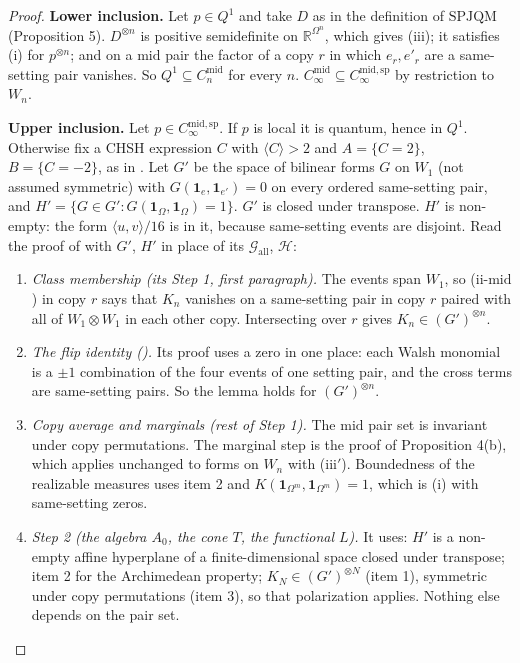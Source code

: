 \documentclass[11pt,a4paper]{article}
\theoremstyle{definition}
\theoremstyle{remark}
\newcommand{\ind}[1]{\mathbf{1}_{#1}}
\newcommand{\SPJQM}{\mathrm{SPJQM}}
\newcommand{\md}{\mathrm{mid}}
\begin{document}
\begin{proof}
\textbf{Lower inclusion.} Let $p \in Q^1$ and take $D$ as in the definition of $\SPJQM$ (Proposition 5). $D^{\otimes n}$ is positive semidefinite on $\mathbb{R}^{\Omega^n}$, which gives (iii); it satisfies (i) for $p^{\otimes n}$; and on a $\md$ pair the factor of a copy $r$ in which $e_r, e'_r$ are a same-setting pair vanishes. So $Q^1 \subseteq C_n^{\md}$ for every $n$. $C_\infty^{\md} \subseteq C_\infty^{\md,\mathrm{sp}}$ by restriction to $W_n$.

\textbf{Upper inclusion.} Let $p \in C_\infty^{\md,\mathrm{sp}}$. If $p$ is local it is quantum, hence in $Q^1$. Otherwise fix a CHSH expression $C$ with $\langle C \rangle > 2$ and $A = \{C = 2\}$, $B = \{C = -2\}$, as in \cite{R7}. Let $G'$ be the space of bilinear forms $G$ on $W_1$ (not assumed symmetric) with $G(\ind{e}, \ind{e'}) = 0$ on every ordered same-setting pair, and $H' = \{G \in G' : G(\ind{\Omega}, \ind{\Omega}) = 1\}$. $G'$ is closed under transpose. $H'$ is non-empty: the form $\langle u, v \rangle/16$ is in it, because same-setting events are disjoint. Read the proof of \cite[Theorem 13]{R7} with $G'$, $H'$ in place of its $\mathcal{G}_{\mathrm{all}}$, $\mathcal{H}$:
\begin{enumerate}
  \item \emph{Class membership (its Step 1, first paragraph).} The events span $W_1$, so (ii-$\md$) in copy $r$ says that $K_n$ vanishes on a same-setting pair in copy $r$ paired with all of $W_1 \otimes W_1$ in each other copy. Intersecting over $r$ gives $K_n \in (G')^{\otimes n}$.
  \item \emph{The flip identity (\cite[Lemma 12]{R7}).} Its proof uses a zero in one place: each Walsh monomial is a $\pm 1$ combination of the four events of one setting pair, and the cross terms are same-setting pairs. So the lemma holds for $(G')^{\otimes n}$.
  \item \emph{Copy average and marginals (rest of Step 1).} The $\md$ pair set is invariant under copy permutations. The marginal step is the proof of Proposition 4(b), which applies unchanged to forms on $W_n$ with (iii$'$). Boundedness of the realizable measures uses item 2 and $K(\ind{\Omega^m}, \ind{\Omega^m}) = 1$, which is (i) with same-setting zeros.
  \item \emph{Step 2 (the algebra $A_0$, the cone $T$, the functional $L$).} It uses: $H'$ is a non-empty affine hyperplane of a finite-dimensional space closed under transpose; item 2 for the Archimedean property; $K_N \in (G')^{\otimes N}$ (item 1), symmetric under copy permutations (item 3), so that polarization applies. Nothing else depends on the pair set.

\end{enumerate}
\end{proof}
\end{document}

